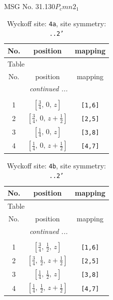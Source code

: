 \documentclass[fleqn,8pt]{jsarticle}
\begin{document}
\setcounter{MaxMatrixCols}{32}

\renewcommand{\tablename}{Table~}
\renewcommand{\figurename}{Figure~}
\begin{center}
\LARGE
MSG No. 31.130\quad$P_{c}mn2_{1}$
\end{center}
\renewcommand{\arraystretch}{1.2}
\begin{longtable}{ccc}
\caption{Wyckoff site: {\tt 4a}, site symmetry: {\tt ..2'}}
 \\
 \hline \hline
No. & position & mapping \\ \hline \endfirsthead

\multicolumn{2}{l}{\tablename\ \thetable{}} \\
 \hline \hline
No. & position & mapping \\ \hline \endhead

 \hline \hline
\multicolumn{2}{r}{\footnotesize\it continued ...} \\ \endfoot

 \hline \hline
\multicolumn{2}{r}{} \\ \endlastfoot

1 & $\left[ \frac{3}{4},\, 0,\, z \right]$ & {\tt [1,6]} \\ \hline
2 & $\left[ \frac{3}{4},\, 0,\, z + \frac{1}{2} \right]$ & {\tt [2,5]} \\ \hline
3 & $\left[ \frac{1}{4},\, 0,\, z \right]$ & {\tt [3,8]} \\ \hline
4 & $\left[ \frac{1}{4},\, 0,\, z + \frac{1}{2} \right]$ & {\tt [4,7]} \\
\end{longtable}
\renewcommand{\arraystretch}{1.2}
\begin{longtable}{ccc}
\caption{Wyckoff site: {\tt 4b}, site symmetry: {\tt ..2'}}
 \\
 \hline \hline
No. & position & mapping \\ \hline \endfirsthead

\multicolumn{2}{l}{\tablename\ \thetable{}} \\
 \hline \hline
No. & position & mapping \\ \hline \endhead

 \hline \hline
\multicolumn{2}{r}{\footnotesize\it continued ...} \\ \endfoot

 \hline \hline
\multicolumn{2}{r}{} \\ \endlastfoot

1 & $\left[ \frac{3}{4},\, \frac{1}{2},\, z \right]$ & {\tt [1,6]} \\ \hline
2 & $\left[ \frac{3}{4},\, \frac{1}{2},\, z + \frac{1}{2} \right]$ & {\tt [2,5]} \\ \hline
3 & $\left[ \frac{1}{4},\, \frac{1}{2},\, z \right]$ & {\tt [3,8]} \\ \hline
4 & $\left[ \frac{1}{4},\, \frac{1}{2},\, z + \frac{1}{2} \right]$ & {\tt [4,7]} \\
\end{longtable}
\end{document}

